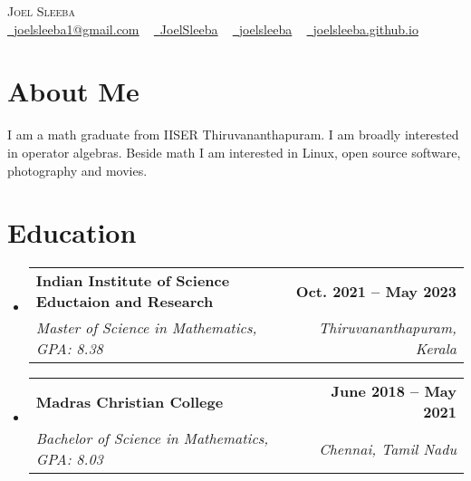 \documentclass[letterpaper,11pt]{article}
\makeatletter
\newcommand{\resumeSubheading}[4]{
  \vspace{-2pt}\item
    \begin{tabular*}{1.0\textwidth}[t]{l@{\extracolsep{\fill}}r}
      \textbf{#1} & \textbf{\small #2} \\
      \textit{\small#3} & \textit{\small #4} \\
    \end{tabular*}\vspace{-7pt}
}
\newcommand{\resumeSubHeadingListStart}{\begin{itemize}[leftmargin=0.0in, label={}]}
\newcommand{\resumeSubHeadingListEnd}{\end{itemize}}
\makeatother
\begin{document}

\begin{center}
    {\Huge \scshape Joel Sleeba} \\ \vspace{5pt}
    \small \href{mailto:joelsleeba1@gmail.com}{\raisebox{-0.2\height}\faEnvelope\  \ul{joelsleeba1@gmail.com}} ~ 
    \href{https://twitter.com/JoelSleeba/}{\raisebox{-0.2\height}\faTwitter\ \ul{JoelSleeba}}  ~
    \href{https://github.com/joelsleeba}{\raisebox{-0.2\height}\faGithub\ \ul{joelsleeba}} ~
    \href{https://joelsleeba.github.io/}{\raisebox{-0.2\height}\faGlobe\ \ul{joelsleeba.github.io}}

    \vspace{-5pt}
\end{center}

\hypersetup{
  urlcolor=blue
  }

\section{About Me}
I am a math graduate from IISER Thiruvananthapuram. I am broadly interested in operator algebras. Beside math I am interested in Linux, open source software, photography and movies.
\vspace{-5pt}

\section{Education}
  \resumeSubHeadingListStart
    \resumeSubheading
      {Indian Institute of Science Eductaion and Research}{Oct. 2021 -- May 2023}
      {Master of Science in Mathematics, GPA: 8.38}{Thiruvananthapuram, Kerala}
  \resumeSubHeadingListEnd
  \vspace{-12pt}
  \resumeSubHeadingListStart
    \resumeSubheading
      {Madras Christian College}{June 2018 -- May 2021}
      {Bachelor of Science in Mathematics, GPA: 8.03}{Chennai, Tamil Nadu}
  \resumeSubHeadingListEnd
  \vspace{-8pt}
\end{document}
